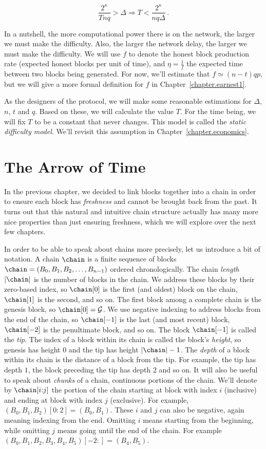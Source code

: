 \[
  \frac{2^\kappa}{Tnq} > \Delta \Rightarrow T < \frac{2^\kappa}{nq\Delta}\,.
\]

In a nutshell, the more computational power there is on the network, the larger we must make the difficulty.
Also, the larger the network delay, the larger we must make the difficulty.
We will use $f$ to denote the honest block production rate (expected honest blocks per unit of time),
and $\eta = \frac{1}{f}$ the expected time between two blocks being generated.
For now, we'll estimate that $f \simeq (n - t)qp$, but we will give a more
formal definition for $f$ in Chapter~\ref{chapter.earnest1}.

As the designers of the protocol, we will make some reasonable estimations for $\Delta$, $n$, $t$ and $q$.
Based on these, we will calculate the value $T$. For the time being, we will fix $T$ to be a constant
that never changes. This model is called the \emph{static difficulty model}. We'll revisit this assumption
in Chapter~\ref{chapter.economics}.

\section{The Arrow of Time}

In the previous chapter, we decided to link blocks together into a chain in order to ensure each block
has \emph{freshness} and cannot be brought back from the past. It turns out that this natural and
intuitive chain structure actually has many more nice properties than just ensuring freshness, which
we will explore over the next few chapters.

In order to be able to speak about chains more precisely,
let us introduce a bit of notation. A chain $\chain$ is a finite sequence of blocks
$\chain = (B_0, B_1, B_2, \ldots, B_{n-1})$ ordered chronologically.
The chain \emph{length} $|\chain|$ is the number of blocks in the chain.
We address these blocks by their zero-based index,
so $\chain[0]$ is the first (and oldest) block on the chain, $\chain[1]$ is the second, and so on.
The first block among a complete chain is the genesis block, so $\chain[0] = \mathcal{G}$.
We use negative indexing to address blocks from the end of the chain, so $\chain[-1]$
is the last (and most recent) block, $\chain[-2]$ is the penultimate block, and so on.
The block $\chain[-1]$ is called the \emph{tip}.
The index of a block within its chain is called the block's \emph{height},
so genesis has height $0$ and the tip has height $|\chain| - 1$.
The \emph{depth} of a block within its chain is the distance of a block
from the tip. For example, the tip has depth $1$, the block preceding the
tip has depth $2$ and so on.
It will also be useful to speak about \emph{chunks} of a chain, continuous portions
of the chain. We'll denote by $\chain[i{:}j]$ the portion of the chain starting at block
with index $i$ (inclusive) and ending at block with index $j$ (exclusive). For example,
$(B_0, B_1, B_2)[0{:}2] = (B_0, B_1)$. These $i$ and $j$ can also be negative, again meaning
indexing from the end. Omitting $i$ means starting from the beginning, while
omitting $j$ means going until the end of the chain. For example
$(B_0, B_1, B_2, B_3, B_4, B_5)[-2{:}] = (B_4, B_5)$.

